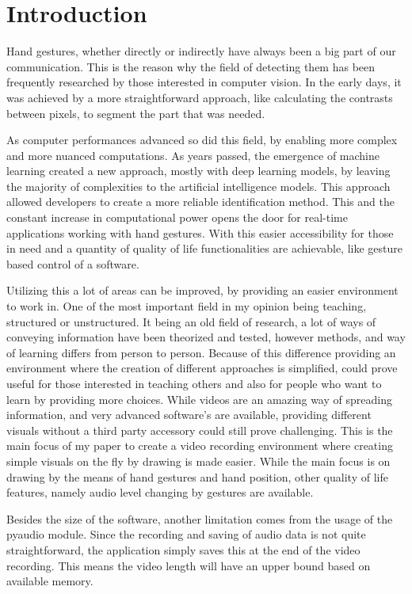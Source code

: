 \chapter{Introduction}
\label{intro}

\par Hand gestures, whether directly or indirectly have always been a big part of our communication. This is the reason why the field of detecting them has been frequently researched by those interested in computer vision. In the early days, it was achieved by a more straightforward approach, like calculating the contrasts between pixels, to segment the part that was needed.
\par As computer performances advanced so did this field, by enabling more complex and more nuanced computations. As years passed, the emergence of machine learning created a new approach, mostly with deep learning models, by leaving the majority of complexities to the artificial intelligence models. This approach allowed developers to create a more reliable identification method. This and the constant increase in computational power opens the door for real-time applications working with hand gestures. With this easier accessibility for those in need and a quantity of quality of life functionalities are achievable, like gesture based control of a software.
\par Utilizing this a lot of areas can be improved, by providing an easier environment to work in. One of the most important field in my opinion being teaching, structured or unstructured. It being an old field of research, a lot of ways of conveying information have been theorized and tested, however methods, and way of learning differs from person to person. Because of this difference providing an environment where the creation of different approaches is simplified, could prove useful for those interested in teaching others and also for people who want to learn by providing more choices. While videos are an amazing way of spreading information, and very advanced software's are available, providing different visuals without a third party accessory could still prove challenging. This is the main focus of my paper to create a video recording environment where creating simple visuals on the fly by drawing is made easier. While the main focus is on drawing by the means of hand gestures and hand position, other quality of life features, namely audio level changing by gestures are available.
\par Besides the size of the software, another limitation comes from the usage of the pyaudio module. Since the recording and saving of audio data is not quite straightforward, the application simply saves this at the end of the video recording. This means the video length will have an upper bound based on available memory.
